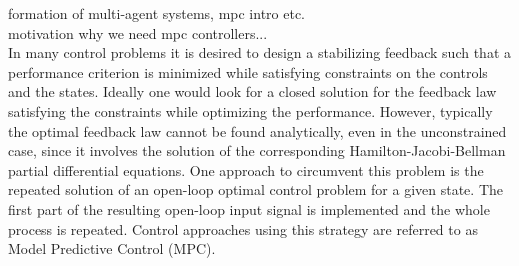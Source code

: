 \noindent formation of multi-agent systems, mpc intro etc. \\

\noindent motivation why we need mpc controllers...  \\

\noindent In many control problems it is desired to design a stabilizing
feedback such that a performance criterion is minimized while satisfying
constraints on the controls and the states. Ideally one would look for a
closed solution for the feedback law satisfying the constraints while
optimizing the performance. However, typically the optimal feedback law
cannot be found analytically, even in the unconstrained case, since it involves
the solution of the corresponding Hamilton-Jacobi-Bellman partial differential
equations. One approach to circumvent this problem is the repeated solution of
an open-loop optimal control problem for a given state. The first part of the
resulting open-loop input signal is implemented and the whole process is
repeated. Control approaches using this strategy are referred to as Model
Predictive Control (MPC).

